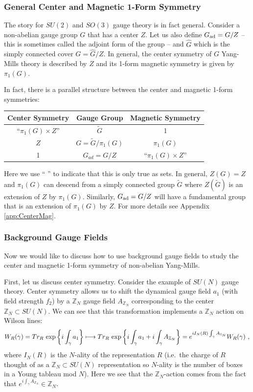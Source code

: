 \documentclass[11pt]{article}
\newcommand{\eq}[1]{\begin{align}\begin{split}#1\end{split}\end{align}}
\def\tG{{\widetilde{G}}}
\def\IZ{{\mathbb{Z}}}
\def\hatG{{\widehat{G}}}
\begin{document}
\subsubsection{General Center and Magnetic 1-Form Symmetry}

The story for $SU(2)$ and $SO(3)$ gauge theory is in fact   general. Consider a non-abelian gauge group $G$ that has a center $Z$. Let us also define $G_{\rm ad}=G/Z$ -- this is sometimes called the adjoint form of the group  -- and $\hatG$ which is the simply connected cover $G=\hatG/Z$. In general, the   center symmetry of $G$ Yang-Mills theory is described by $Z$ and its 1-form magnetic symmetry is given by $\pi_1(G)$. 

In fact, there is a parallel structure between the center and magnetic 1-form  symmetries:
\begin{center}\begin{tabular}{c|c|c}
Center Symmetry & Gauge Group & Magnetic Symmetry\\
\hline 
``$\pi_1(G)\times Z$'' & $\tG$ & 1\\
$Z$ & $G=\tG/\pi_1(G)$ & $\pi_1(G)$\\
1& $G_{ad}=G/Z$ & ``$\pi_1(G)\times Z$''
\end{tabular}
\end{center}
Here we use `` '' to indicate that this is only true as sets. In general, $Z(G)=Z$ and $\pi_1(G)$ can descend from a simply connected group $\tG$ where $Z(\tG)$ is an extension of $Z$ by $\pi_1(G)$. Similarly, $G_{\rm ad}=G/Z$ will have a fundamental group that is an extension of $\pi_1(G)$ by $Z$.  For more details see Appendix \ref{app:CenterMag}.



 


\subsubsection{Background Gauge Fields}

\label{centerbackground}
Now we would like to discuss how to use background gauge fields to study the center and magnetic 1-form  symmetry of non-abelian Yang-Mills. 

First, let us discuss center symmetry. Consider the example of $SU(N)$ gauge theory. Center symmetry allows us to shift the dynamical gauge field $a_1$ (with field strength $f_2$) by a $\IZ_N$ gauge field $A_{\IZ_N}$ corresponding to the center $\IZ_N\subset SU(N)$. We can see that this transformation implements a $\IZ_N$ action on Wilson lines: 
\eq{
W_R(\gamma)=Tr_R~{\rm exp}\left\{i \int_\gamma a_1\right\}\longmapsto Tr_R~{\rm exp}\left\{i \int_\gamma a_1+i \int_\gamma A_{\IZ_N}\right\}=e^{i I_N(R)\int_\gamma A_{\IZ_N}}W_R(\gamma)~,
}
where $I_N(R)$ is the $N$-ality of the representation $R$ (i.e.~the charge of $R$ thought of as a $\IZ_N\subset SU(N)$ representation so $N$-ality is the number of boxes in a Young tableau mod $N$). Here we see that the $\IZ_N$-action comes from the fact that $e^{i\int_\gamma A_{\IZ_N}}\in \IZ_N$. 
\end{document}
